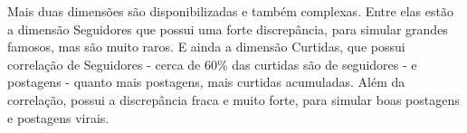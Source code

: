 \documentclass[
	12pt,				%
	openright,			%
	oneside,			%
	a4paper,			%
	english,			%
	brazil				%
	]{abntex2}
\begin{document}
		Mais duas dimensões são disponibilizadas e também complexas.
		Entre elas estão a dimensão Seguidores que possui uma forte discrepância, para simular grandes famosos, mas são muito raros.
		E ainda a dimensão Curtidas, que possui correlação de Seguidores - cerca de 60\% das curtidas são de seguidores - e postagens - quanto mais postagens, mais curtidas acumuladas.
		Além da correlação, possui a discrepância fraca e muito forte, para simular boas postagens e postagens virais.
		\par


		\par
\end{document}
